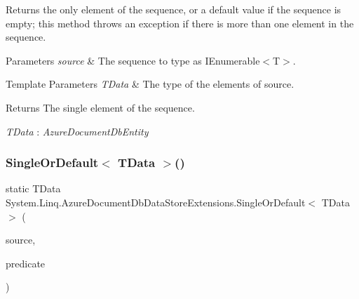 Returns the only element of the sequence, or a default value if the sequence is empty; this method throws an exception if there is more than one element in the sequence. 


\begin{DoxyParams}{Parameters}
{\em source} & The sequence to type as I\+Enumerable$<$\+T$>$.\\
\hline
\end{DoxyParams}

\begin{DoxyTemplParams}{Template Parameters}
{\em T\+Data} & The type of the elements of source.\\
\hline
\end{DoxyTemplParams}
\begin{DoxyReturn}{Returns}
The single element of the sequence.
\end{DoxyReturn}
\begin{Desc}
\item[Type Constraints]\begin{description}
\item[{\em T\+Data} : {\em Azure\+Document\+Db\+Entity}]\end{description}
\end{Desc}
\mbox{\label{classSystem_1_1Linq_1_1AzureDocumentDbDataStoreExtensions_a37c11caa4a5e82f4761bf3b910ee0f15}} 
\subsubsection{\texorpdfstring{Single\+Or\+Default$<$ T\+Data $>$()}{SingleOrDefault< TData >()}\hspace{0.1cm}{\footnotesize\ttfamily [2/2]}}
{\footnotesize\ttfamily static T\+Data System.\+Linq.\+Azure\+Document\+Db\+Data\+Store\+Extensions.\+Single\+Or\+Default$<$ T\+Data $>$ (\begin{DoxyParamCaption}\item[{this \hyperlink{classCqrs_1_1Azure_1_1DocumentDb_1_1DataStores_1_1AzureDocumentDbDataStore}{Azure\+Document\+Db\+Data\+Store}$<$ T\+Data $>$}]{source,  }\item[{Func$<$ T\+Data, bool $>$}]{predicate }\end{DoxyParamCaption})\hspace{0.3cm}{\ttfamily [static]}}



